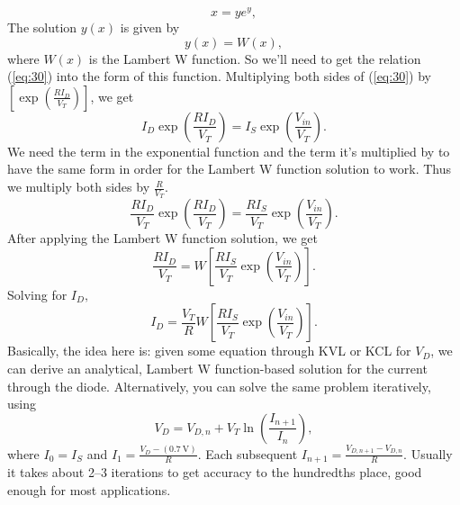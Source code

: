 \documentclass[12pt]{report}
\begin{document}
\begin{equation}
\label{eq:31}
x = y e^{y},
\end{equation}
The solution $y(x)$ is given by
\begin{equation}
\label{eq:32}
y(x) = W(x),
\end{equation}
where $W(x)$ is the Lambert W function. So we'll need to get the relation (\ref{eq:30}) into the form of this function.
Multiplying both sides of (\ref{eq:30}) by $\left[ \exp \left( \frac{R I_{D}}{V_{T}} \right) \right]$, we get
\begin{equation}
\label{eq:33}
I_{D} \exp \left( \frac{R I_{D}}{V_{T}} \right) = I_{S} \exp \left( \frac{V_{in}}{V_{T}} \right).
\end{equation}
We need the term in the exponential function and the term it's multiplied by to have the same form in order for the Lambert W function solution to work. Thus we multiply both sides by $\frac{R}{V_{T}}$.
\begin{equation}
\label{eq:34}
\frac{R I_{D}}{V_{T}} \exp \left( \frac{R I_{D}}{V_{T}} \right) = \frac{R I_{S}}{V_{T}} \exp \left( \frac{V_{in}}{V_{T}} \right).
\end{equation}
After applying the Lambert W function solution, we get
\begin{equation}
\label{eq:35}
\frac{R I_{D}}{V_{T}} = W \left[ \frac{R I_{S}}{V_{T}} \exp \left( \frac{V_{in}}{V_{T}} \right) \right].
\end{equation}
Solving for $I_{D},$
\begin{equation}
\label{eq:36}
I_{D} = \frac{V_{T}}{R} W \left[ \frac{R I_{S}}{V_{T}} \exp \left( \frac{V_{in}}{V_{T}} \right) \right].
\end{equation}
Basically, the idea here is: given some equation through KVL or KCL for $V_{D}$, we can derive an analytical, Lambert W function-based solution for the current through the diode. Alternatively, you can solve the same problem iteratively, using
\begin{equation}
\label{eq:37}
V_{D} = V_{D,n} + V_{T} \ln \left( \frac{I_{n+1}}{I_{n}} \right),
\end{equation}
where $I_{0} = I_{S}$ and $I_{1} = \frac{ V_{D} - \left( \SI{0.7}{\volt} \right) }{R}$. Each subsequent $I_{n+1} = \frac{ V_{D,n+1} - V_{D,n} }{R}$. Usually it takes about 2--3 iterations to get accuracy to the hundredths place, good enough for most applications.
\end{document}
